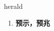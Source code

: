 
\begin{frame}
{\huge herald}
\begin{center}
\begin{enumerate}\Large
  \item \textbf{预示，预兆}
\end{enumerate}
\end{center}
\end{frame}

